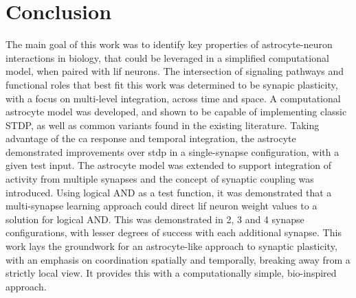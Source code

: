 \documentclass[conference]{IEEEtran}
\newcommand{\ca}{\gls{ca}\textrm{ }}
\begin{document}
\section{Conclusion} \label{section:conclusion}
The main goal of this work was to identify key properties of astrocyte-neuron
interactions in biology, that could be leveraged in a simplified computational
model, when paired with \gls{lif} neurons. The intersection of signaling
pathways and functional roles that best fit this work was determined to be
synapic plasticity, with a focus on multi-level integration, across time and
space. A computational astrocyte model was developed, and shown to be capable of
implementing classic STDP, as well as common variants found in the existing
literature. Taking advantage of the \ca response and temporal integration, the
astrocyte demonstrated improvements over \gls{stdp} in a single-synapse
configuration, with a given test input. The astrocyte model was extended to
support integration of activity from multiple synapses and the concept of
synaptic coupling was introduced. Using logical AND as a test function, it was
demonstrated that a multi-synapse learning approach could direct \gls{lif}
neuron weight values to a solution for logical AND. This was demonstrated in 2,
3 and 4 synapse configurations, with lesser degrees of success with each
additional synapse. This work lays the groundwork for an astrocyte-like approach
to synaptic plasticity, with an emphasis on coordination spatially and
temporally, breaking away from a strictly local view. It provides this with a
computationally simple, bio-inspired approach.



\printbibliography[heading=bibintoc]
\end{document}
